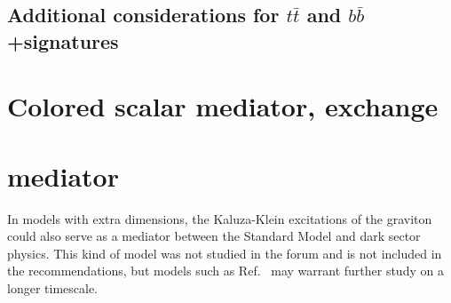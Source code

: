 %

\subsection{\texorpdfstring{Additional considerations for $t \bar{t}$ and $b \bar{b}$+\MET signatures}{Additional considerations for ttbar/bbbar+\MET signatures}}
\label{subsec:DMHFModels}



\section{Colored scalar mediator, \tchannel exchange}
\label{sec:monojet_t_channel}


\section{ \Spintwo mediator}
\label{sec:spintwo}

In models with extra dimensions, the Kaluza-Klein excitations of the graviton could also serve as a mediator between the Standard Model and dark sector physics. This kind of model was not studied in the forum and is not included in the recommendations, but models such as Ref.~\cite{Lee:2013bua,Lee:2014caa} may warrant further study on a longer timescale. 



